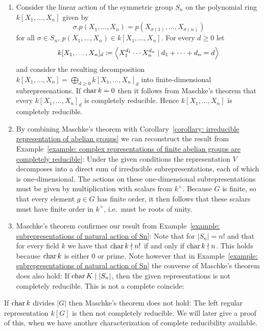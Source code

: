 \begin{example}
  \leavevmode
  \begin{enumerate}
    \item
      Consider the linear action of the symmetric group $S_n$ on the polynomial ring $k[X_1, \dotsc, X_n]$ given by
      \[
          \sigma.p(X_1, \dotsc, X_n)
        = p(X_{\sigma(1)}, \dotsc, X_{\sigma(n)})
      \]
      for all $\sigma \in S_n$, $p(X_1, \dotsc, X_n) \in k[X_1, \dotsc, X_n]$.
      For every $d \geq 0$ let
      \[
                  k[X_1, \dotsc, X_n]_d
        \coloneqq  \left\langle  X_1^{d_1} \dotsm X_n^{d_n} \mid d_1 + \dotsb + d_n = d  \right\rangle
      \]
      and consider the resulting decomposition $k[X_1, \dotsc, X_n] = \bigoplus_{d \geq 0} k[X_1, \dotsc, X_n]_d$ into finite-dimensional subrepresenations.
      If $\operatorname{char} k = 0$ then it follows from Maschke’s theorem that every $k[X_1, \dotsc, X_n]_d$ is completely reducible.
      Hence $k[X_1, \dotsc, X_n]$ is completely reducible.
    \item
      By combining Maschke’s theorem with Corollary~\ref{corollary: irreducible representation of abelian groups} we can reconstruct the result from Example~\ref{example: complex representations of finite abelian groups are completely reducible}:
      Under the given conditions the representation $V$ decomposes into a direct sum of irreducible subrepresentations, each of which is one-dimensional.
      The actions on these one-dimensional subrepresentations must be given by multiplication with scalars from $k^\times$.
      Because $G$ is finite, so that every element $g \in G$ has finite order, it then follows that these scalars must have finite order in $k^\times$, i.e.\ must be roots of unity.
      
    \item
      Maschke’s theorem confirmes our result from Example~\ref{example: subrepresentations of natural action of Sn}:
      Note that for $|S_n| = n!$ and that for every field $k$ we have that $\operatorname{char} k \nmid n!$ if and only if $\operatorname{char} k \nmid n$.
      This holds because $\operatorname{char} k$ is either $0$ or prime.
      Note however that in Example~\ref{example: subrepresentations of natural action of Sn} the converse of Maschke’s theorem does also hold:
      If $\operatorname{char} K \mid |S_n|$, then the given representations is not completely reducible.
      This is not a complete coincide:
  \end{enumerate}
\end{example}


\begin{warning}
  If $\operatorname{char} k$ divides $|G|$ then Maschke’s theorem does not hold:
  The left regular representation $k[G]$ is then not completely reducible.
  We will later give a proof of this, when we have another characterization of complete reducibility available.
\end{warning}


